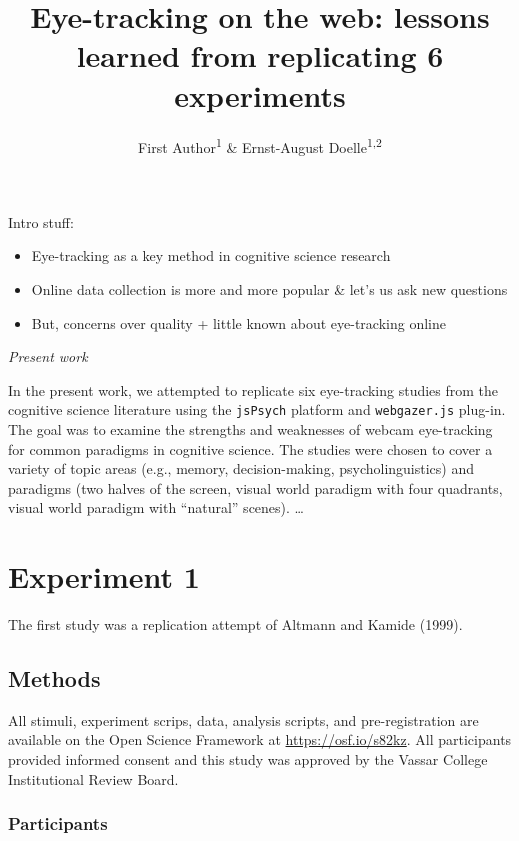 \documentclass[
  english,
  man]{apa6}
\title{Eye-tracking on the web: lessons learned from replicating 6 experiments}
\author{First Author\textsuperscript{1} \& Ernst-August Doelle\textsuperscript{1,2}}
\date{}
\affiliation{\vspace{0.5cm}\textsuperscript{1} Wilhelm-Wundt-University\\\textsuperscript{2} Konstanz Business School}
\begin{document}
\maketitle

Intro stuff:

\begin{itemize}
\item
  Eye-tracking as a key method in cognitive science research
\item
  Online data collection is more and more popular \& let's us ask new questions
\item
  But, concerns over quality + little known about eye-tracking online
\end{itemize}

\emph{Present work}

In the present work, we attempted to replicate six eye-tracking studies from the cognitive science literature using the \texttt{jsPsych} platform and \texttt{webgazer.js} plug-in. The goal was to examine the strengths and weaknesses of webcam eye-tracking for common paradigms in cognitive science. The studies were chosen to cover a variety of topic areas (e.g., memory, decision-making, psycholinguistics) and paradigms (two halves of the screen, visual world paradigm with four quadrants, visual world paradigm with ``natural'' scenes). \ldots{}

\hypertarget{experiment-1}{%
\section{Experiment 1}\label{experiment-1}}

The first study was a replication attempt of Altmann and Kamide (1999).

\hypertarget{methods}{%
\subsection{Methods}\label{methods}}

All stimuli, experiment scrips, data, analysis scripts, and pre-registration are available on the Open Science Framework at \url{https://osf.io/s82kz}. All participants provided informed consent and this study was approved by the Vassar College Institutional Review Board.

\hypertarget{participants}{%
\subsubsection{Participants}\label{participants}}
\end{document}
